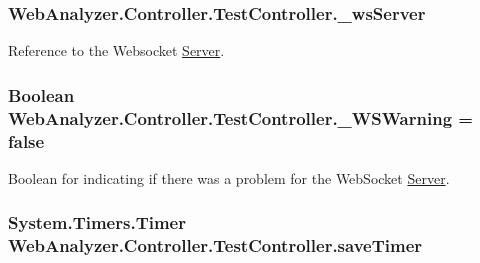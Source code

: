 \hypertarget{class_web_analyzer_1_1_controller_1_1_test_controller_aeb605e9f2ad9c53af52fb846fe2a98a6}{}
\subsubsection[{\+\_\+ws\+Server}]{ Web\+Analyzer.\+Controller.\+Test\+Controller.\+\_\+ws\+Server\hspace{0.3cm}{\ttfamily [private]}}\label{class_web_analyzer_1_1_controller_1_1_test_controller_aeb605e9f2ad9c53af52fb846fe2a98a6}


Reference to the Websocket \hyperlink{namespace_web_analyzer_1_1_server}{Server}. 

\hypertarget{class_web_analyzer_1_1_controller_1_1_test_controller_a517bab0ee0c22871788bd498de86c27e}{}
\subsubsection[{\+\_\+\+W\+S\+Warning}]{\setlength{\rightskip}{0pt plus 5cm}Boolean Web\+Analyzer.\+Controller.\+Test\+Controller.\+\_\+\+W\+S\+Warning = {\bf false}\hspace{0.3cm}{\ttfamily [private]}}\label{class_web_analyzer_1_1_controller_1_1_test_controller_a517bab0ee0c22871788bd498de86c27e}


Boolean for indicating if there was a problem for the Web\+Socket \hyperlink{namespace_web_analyzer_1_1_server}{Server}. 

\hypertarget{class_web_analyzer_1_1_controller_1_1_test_controller_a484747e48ceb23e931111018ed87d8e1}{}
\subsubsection[{save\+Timer}]{\setlength{\rightskip}{0pt plus 5cm}System.\+Timers.\+Timer Web\+Analyzer.\+Controller.\+Test\+Controller.\+save\+Timer\hspace{0.3cm}{\ttfamily [private]}}\label{class_web_analyzer_1_1_controller_1_1_test_controller_a484747e48ceb23e931111018ed87d8e1}


